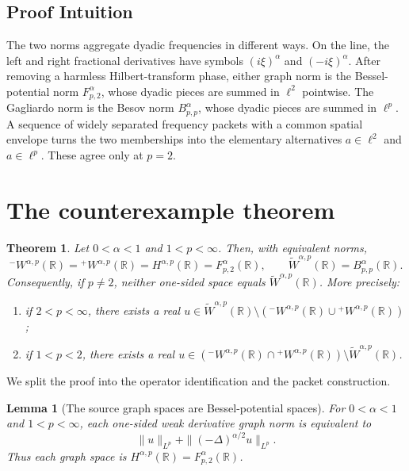 \documentclass[11pt]{article}
\newtheorem{theorem}{Theorem}
\newtheorem{lemma}{Lemma}
\newcommand{\R}{\mathbb R}
\newcommand{\Wminus}{{}^{-}\!W^{\alpha,p}(\R)}
\newcommand{\Wplus}{{}^{+}\!W^{\alpha,p}(\R)}
\newcommand{\Gag}{\widetilde W^{\alpha,p}(\R)}
\begin{document}
\subsection*{Proof Intuition}

The two norms aggregate dyadic frequencies in different ways.  On the line,
the left and right fractional derivatives have symbols $(i\xi)^\alpha$ and
$(-i\xi)^\alpha$.  After removing a harmless Hilbert-transform phase, either
graph norm is the Bessel-potential norm $F^\alpha_{p,2}$, whose dyadic pieces
are summed in $\ell^2$ pointwise.  The Gagliardo norm is the Besov norm
$B^\alpha_{p,p}$, whose dyadic pieces are summed in $\ell^p$.  A sequence of
widely separated frequency packets with a common spatial envelope turns the
two memberships into the elementary alternatives $a\in\ell^2$ and
$a\in\ell^p$.  These agree only at $p=2$.

\section{The counterexample theorem}

\begin{theorem}\label{thm:main}
Let $0<\alpha<1$ and $1<p<\infty$.  Then, with equivalent norms,
\[
 \Wminus=\Wplus=H^{\alpha,p}(\R)=F^\alpha_{p,2}(\R),
 \qquad
 \Gag=B^\alpha_{p,p}(\R).
\]
Consequently, if $p\ne2$, neither one-sided space equals $\Gag$.
More precisely:
\begin{enumerate}[label=\textup{(\roman*)}]
\item if $2<p<\infty$, there exists a real
$u\in\Gag\setminus(\Wminus\cup\Wplus)$;
\item if $1<p<2$, there exists a real
$u\in(\Wminus\cap\Wplus)\setminus\Gag$.
\end{enumerate}
\end{theorem}

We split the proof into the operator identification and the packet
construction.

\begin{lemma}[The source graph spaces are Bessel-potential spaces]
\label{lem:graph}
For $0<\alpha<1$ and $1<p<\infty$, each one-sided weak derivative graph norm
is equivalent to
\[
 \|u\|_{L^p}+\|(-\Delta)^{\alpha/2}u\|_{L^p}.
\]
Thus each graph space is $H^{\alpha,p}(\R)=F^\alpha_{p,2}(\R)$.
\end{lemma}
\end{document}
